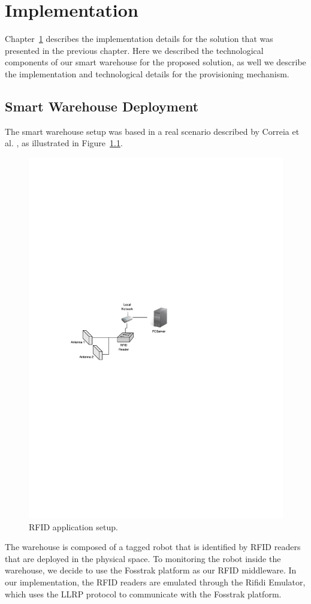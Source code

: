 
\chapter{Implementation}
\label{chapter:implementation}
Chapter~\ref{chapter:implementation} describes the implementation details for the solution that was
presented in the previous chapter. Here we described the technological components of our smart
warehouse for the proposed solution, as well we describe the implementation and technological details
for the provisioning mechanism.

\section{Smart Warehouse Deployment}
\label{sec:Smart Place}
The smart warehouse setup was based in a real scenario described by Correia et al. \cite{correiaalpharfid},
as illustrated in Figure~\ref{fig:rfidapp_setup}.\\

\begin{figure}[ht!]
  \centering
  \includegraphics[width=.6\textwidth]{./images/rfidapp_setup}
  \caption{RFID application setup.}
  \label{fig:rfidapp_setup}
\end{figure}

The warehouse is composed of a tagged robot that is identified by \gls{RFID} readers that are deployed
in the physical space. To monitoring the robot inside the warehouse, we decide to use the Fosstrak
platform as our \gls{RFID} middleware. In our implementation, the \gls{RFID} readers are emulated
through the Rifidi Emulator, which uses the \gls{LLRP} protocol to communicate with the Fosstrak
platform.

